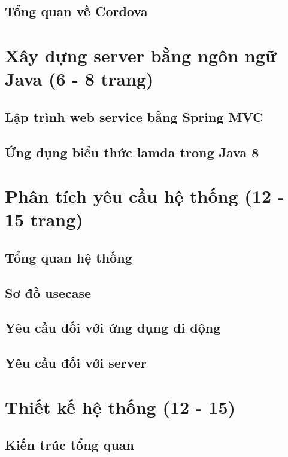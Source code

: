 \documentclass[11pt,a4paper,oneside]{book}
\begin{document}
\section{Tổng quan về Cordova}

\chapter{Xây dựng server bằng ngôn ngữ Java (6 - 8 trang)}
\newpage
\section{Lập trình web service bằng Spring MVC}
\newpage
\section{Ứng dụng biểu thức lamda trong Java 8}
 	 
\chapter{Phân tích yêu cầu hệ thống (12 - 15 trang)}
\newpage
\section{Tổng quan hệ thống}
\newpage
\section{Sơ đồ usecase}
\newpage
\section{Yêu cầu đối với ứng dụng di động}
\newpage
\section{Yêu cầu đối với server}

\chapter{Thiết kế hệ thống (12 - 15)}
\newpage
\section{Kiến trúc tổng quan}
\newpage
\end{document}
